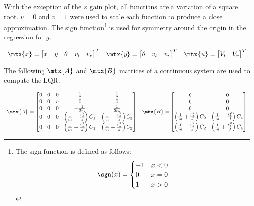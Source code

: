 With the exception of the $x$ gain plot, all functions are a variation of a
square root. $v = 0$ and $v = 1$ were used to scale each function to produce a
close approximation. The sign function\footnote{The sign function is defined as
follows:
\begin{equation*}
  \sgn(x) = \begin{cases}
    -1 & x < 0 \\
    0 & x = 0 \\
    1 & x > 0
  \end{cases}
\end{equation*}} is used for symmetry around the origin in the regression for
$y$.

\begin{theorem}
  \begin{equation*}
    \begin{array}{ccc}
      \mtx{x} =
      \begin{bmatrix}
        x & y & \theta & v_l & v_r
      \end{bmatrix}^T &
      \mtx{y} =
      \begin{bmatrix}
        \theta & v_l & v_r
      \end{bmatrix}^T &
      \mtx{u} =
      \begin{bmatrix}
        V_l & V_r
      \end{bmatrix}^T
    \end{array}
  \end{equation*}

  The following $\mtx{A}$ and $\mtx{B}$ matrices of a continuous system are used
  to compute the LQR.

  \begin{equation}
    \begin{array}{ll}
      \mtx{A} =
      \begin{bmatrix}
        0 & 0 & 0 & \frac{1}{2} & \frac{1}{2} \\
        0 & 0 & v & 0 & 0 \\
        0 & 0 & 0 & -\frac{1}{2r_b} & \frac{1}{2r_b} \\
        0 & 0 & 0 & \left(\frac{1}{m} + \frac{r_b^2}{J}\right) C_1 &
          \left(\frac{1}{m} - \frac{r_b^2}{J}\right) C_3 \\
        0 & 0 & 0 & \left(\frac{1}{m} - \frac{r_b^2}{J}\right) C_1 &
          \left(\frac{1}{m} + \frac{r_b^2}{J}\right) C_3
      \end{bmatrix} &
      \mtx{B} =
      \begin{bmatrix}
        0 & 0 \\
        0 & 0 \\
        0 & 0 \\
        \left(\frac{1}{m} + \frac{r_b^2}{J}\right) C_2 &
        \left(\frac{1}{m} - \frac{r_b^2}{J}\right) C_4 \\
        \left(\frac{1}{m} - \frac{r_b^2}{J}\right) C_2 &
        \left(\frac{1}{m} + \frac{r_b^2}{J}\right) C_4
      \end{bmatrix}
    \end{array}
  \end{equation}


\end{theorem}
